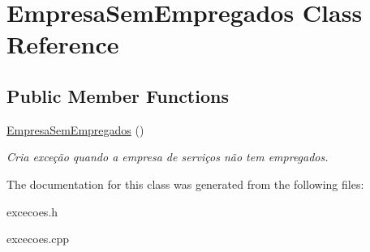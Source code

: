 \hypertarget{class_empresa_sem_empregados}{}\section{Empresa\+Sem\+Empregados Class Reference}
\label{class_empresa_sem_empregados}
\subsection*{Public Member Functions}
\begin{DoxyCompactItemize}
\item 
\hyperlink{class_empresa_sem_empregados_a674a4331127b86b3d27a430b13f062f9}{Empresa\+Sem\+Empregados} ()\hypertarget{class_empresa_sem_empregados_a674a4331127b86b3d27a430b13f062f9}{}\label{class_empresa_sem_empregados_a674a4331127b86b3d27a430b13f062f9}

\begin{DoxyCompactList}\small\item\em Cria exceção quando a empresa de serviços não tem empregados. \end{DoxyCompactList}\end{DoxyCompactItemize}


The documentation for this class was generated from the following files\+:\begin{DoxyCompactItemize}
\item 
excecoes.\+h\item 
excecoes.\+cpp\end{DoxyCompactItemize}
